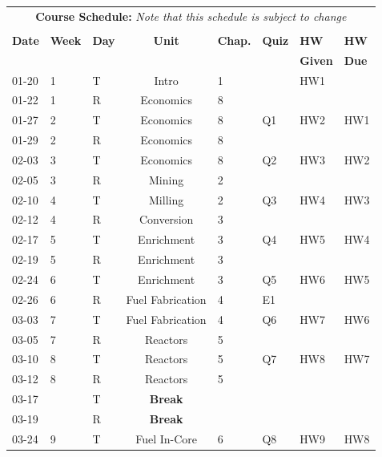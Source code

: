 \documentclass[11pt, a4paper]{article}
\begin{document}
\pagebreak
\FloatBarrier
\renewcommand{\arraystretch}{1}
\begin{table}[h]
\begin{center}
\begin{tabular}{lllcllll}
\multicolumn{8}{c}{\textbf{Course Schedule:}\textit{ Note that this schedule is subject to change}}\\
&&&&&&&\\
\textbf{Date} & \textbf{Week} & \textbf{Day} & \textbf{Unit} & \textbf{Chap.} & \textbf{Quiz} & \textbf{HW} & \textbf{HW}\\
 &  &  &  &  &                                                                                          & \textbf{Given} & \textbf{Due}\\
\hline
\hline
01-20 & 1 & T & Intro      & 1 &           &  HW1 &    \\
01-22 & 1 & R & Economics  & 8 &           &      &    \\
01-27 & 2 & T & Economics  & 8 &        Q1 &  HW2 & HW1\\
01-29 & 2 & R & Economics  & 8 &           &      &    \\
02-03 & 3 & T & Economics  & 8 &        Q2 &  HW3 & HW2\\
02-05 & 3 & R & Mining     & 2 &           &      &    \\
02-10 & 4 & T & Milling    & 2 &        Q3 &  HW4 & HW3\\
02-12 & 4 & R & Conversion & 3 &           &      &    \\
02-17 & 5 & T & Enrichment & 3 &        Q4 &  HW5 & HW4\\
02-19 & 5 & R & Enrichment & 3 &           &      &    \\
02-24 & 6 & T & Enrichment & 3 &        Q5 &  HW6 & HW5\\
02-26 & 6 & R & Fuel Fabrication & 4 &  E1 &      &    \\
03-03 & 7 & T & Fuel Fabrication & 4 &  Q6 &  HW7 & HW6\\
03-05 & 7 & R & Reactors & 5 &             &      &    \\
03-10 & 8 & T & Reactors & 5 &          Q7 &  HW8 & HW7\\
03-12 & 8 & R & Reactors & 5 &             &      &    \\
03-17 &   & T & \textbf{Break} &  &   &      &    \\
03-19 &   & R & \textbf{Break} &  &   &      &    \\
03-24 & 9 & T & Fuel In-Core & 6 &     Q8 &  HW9 & HW8 \\

\end{tabular}
\end{center}
\end{table}
\end{document}
